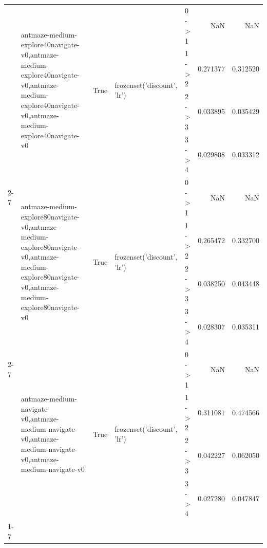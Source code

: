 \begin{tabular}{lllllrr}
 & \multirow[t]{4}{*}{antmaze-medium-explore40navigate-v0,antmaze-medium-explore40navigate-v0,antmaze-medium-explore40navigate-v0,antmaze-medium-explore40navigate-v0} & \multirow[t]{4}{*}{True} & \multirow[t]{4}{*}{frozenset({'discount', 'lr'})} & 0 -> 1 & NaN & NaN \\
 &  &  &  & 1 -> 2 & 0.271377 & 0.312520 \\
 &  &  &  & 2 -> 3 & 0.033895 & 0.035429 \\
 &  &  &  & 3 -> 4 & 0.029808 & 0.033312 \\
\cline{2-7} \cline{3-7} \cline{4-7}
 & \multirow[t]{4}{*}{antmaze-medium-explore80navigate-v0,antmaze-medium-explore80navigate-v0,antmaze-medium-explore80navigate-v0,antmaze-medium-explore80navigate-v0} & \multirow[t]{4}{*}{True} & \multirow[t]{4}{*}{frozenset({'discount', 'lr'})} & 0 -> 1 & NaN & NaN \\
 &  &  &  & 1 -> 2 & 0.265472 & 0.332700 \\
 &  &  &  & 2 -> 3 & 0.038250 & 0.043448 \\
 &  &  &  & 3 -> 4 & 0.028307 & 0.035311 \\
\cline{2-7} \cline{3-7} \cline{4-7}
 & \multirow[t]{4}{*}{antmaze-medium-navigate-v0,antmaze-medium-navigate-v0,antmaze-medium-navigate-v0,antmaze-medium-navigate-v0} & \multirow[t]{4}{*}{True} & \multirow[t]{4}{*}{frozenset({'discount', 'lr'})} & 0 -> 1 & NaN & NaN \\
 &  &  &  & 1 -> 2 & 0.311081 & 0.474566 \\
 &  &  &  & 2 -> 3 & 0.042227 & 0.062050 \\
 &  &  &  & 3 -> 4 & 0.027280 & 0.047847 \\
\cline{1-7} \cline{2-7} \cline{3-7} \cline{4-7}
\bottomrule
\end{tabular}
